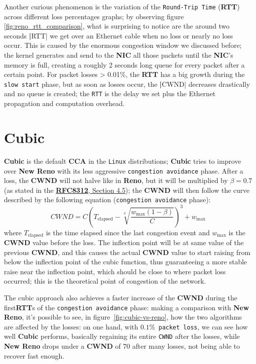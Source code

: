 \documentclass{exam}
\begin{document}
Another curious phenomenon is the variation of the \texttt{Round-Trip Time} (\textbf{RTT}) across different loss percentages graphs; by observing figure \ref{fig:reno_rtt_comparison}, what is surprising to notice are the around two seconds \textbf|RTT| we get over an Ethernet cable when no loss or nearly no loss occur. This is caused by the enormous congestion window we discussed before; the kernel generates and send to the \textbf{NIC} all those packets until the \textbf{NIC}'s memory is full, creating a roughly 2 seconds long queue for every packet after a certain point. For packet losses > 0.01\%, the \textbf{RTT} has a big growth during the \texttt{slow start} phase, but as soon as losses occur, the \textbf|CWND| decreases drastically and no queue is created; the \verb|RTT| is the delay we set plus the Ethernet propagation and computation overhead.


\section{Cubic}
\textbf{Cubic} is the default \textbf{CCA} in the \texttt{Linux} distributions; \textbf{Cubic} tries to improve over \textbf{New Reno} with its less aggressive \texttt{congestion avoidance} phase. After a loss, the \textbf{CWND} will not halve like in \textbf{Reno}, but it will be multiplied by $\beta = 0.7$ (as stated in the \href{https://datatracker.ietf.org/doc/html/rfc8312#section-4.5}{\textbf{RFC8312}, Section 4.5}); the \textbf{CWND} will then follow the curve described by the following equation (\texttt{congestion avoidance} phase):
\[
CWND = C \left( T_{\text{elapsed}} - \sqrt[3]{\frac{w_{\max}(1 - \beta)}{C} } \right)^3 + w_{\max}
\]
where $T_{\text{elapsed}}$ is the time elapsed since the last congestion event and $w_{\max}$ is the \textbf{CWND} value before the loss. The inflection point will be at same value of the previous \textbf{CWND}, and this causes the actual \textbf{CWND} value to start raising from below the inflection point of the cubic function, thus guaranteeing a more stable raise near the inflection point, which should be close to where packet loss occurred; this is the theoretical point of congestion of the network. 

The cubic approach also achieves a faster increase of the \textbf{CWND} during the first\textbf{RTT}s of the \texttt{congestion avoidance} phase: making a comparison with \textbf{New Reno}, it's possible to see, in figure~\ref{fig:cubic-vs-reno}, how the two algorithms are affected by the losses: on one hand, with \texttt{$0.1\%$ packet loss}, we can see how well \textbf{Cubic} performs, basically regaining its entire \texttt{CWND} after the losses, while \textbf{New Reno} drops under a \textbf{CWND} of 70 after many losses, not being able to recover fast enough.
\end{document}
